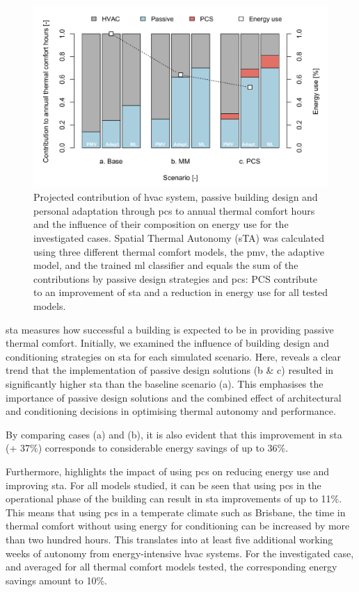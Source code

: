 \begin{figure}[!h]
    \begin{center}
    \includegraphics[width=\textwidth]{manuscript/src/figures/sta-comfort-hour-contribution.png}
    \caption{Projected contribution of \gls{hvac} system, passive building design and personal adaptation through \gls{pcs} to annual thermal comfort hours and the influence of their composition on energy use for the investigated cases. Spatial Thermal Autonomy (sTA) was calculated using three different thermal comfort models, the \gls{pmv}, the adaptive model, and the trained \gls{ml} classifier and equals the sum of the contributions by passive design strategies and \gls{pcs}: PCS contribute to an improvement of \gls{sta} and a reduction in energy use for all tested models.}
    \label{fig:sta-comfort-hours}
    \end{center}
\end{figure}


\gls{sta} measures how successful a building is expected to be in providing passive thermal comfort. Initially, we examined the influence of building design and conditioning strategies on \gls{sta} for each simulated scenario. Here,  reveals a clear trend that the implementation of passive design solutions (b \& c) resulted in significantly higher \gls{sta} than the baseline scenario (a). This emphasises the importance of passive design solutions and the combined effect of architectural and conditioning decisions in optimising thermal autonomy and performance.

By comparing cases (a) and (b), it is also evident that this improvement in \gls{sta} (+ 37\%) corresponds to considerable energy savings of up to 36\%.

Furthermore,  highlights the impact of using \gls{pcs} on reducing energy use and improving \gls{sta}. For all models studied, it can be seen that using \gls{pcs} in the operational phase of the building can result in \gls{sta} improvements of up to 11\%. This means that using \gls{pcs} in a temperate climate such as Brisbane, the time in thermal comfort without using energy for conditioning can be increased by more than two hundred hours. This translates into at least five additional working weeks of autonomy from energy-intensive \gls{hvac} systems. For the investigated case, and averaged for all thermal comfort models tested, the corresponding energy savings amount to 10\%.

